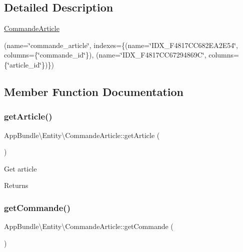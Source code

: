 \subsection{Detailed Description}
\hyperlink{class_app_bundle_1_1_entity_1_1_commande_article}{Commande\+Article}

(name=\char`\"{}commande\+\_\+article\char`\"{}, indexes=\{(name=\char`\"{}\+I\+D\+X\+\_\+\+F4817\+C\+C682\+E\+A2\+E54\char`\"{}, columns=\{\char`\"{}commande\+\_\+id\char`\"{}\}), (name=\char`\"{}\+I\+D\+X\+\_\+\+F4817\+C\+C67294869\+C\char`\"{}, columns=\{\char`\"{}article\+\_\+id\char`\"{}\})\})  

\subsection{Member Function Documentation}
\mbox{\label{class_app_bundle_1_1_entity_1_1_commande_article_a2dc6f8df663dee7a5beeb9758eddccfc}} 
\subsubsection{\texorpdfstring{get\+Article()}{getArticle()}}
{\footnotesize\ttfamily App\+Bundle\textbackslash{}\+Entity\textbackslash{}\+Commande\+Article\+::get\+Article (\begin{DoxyParamCaption}{ }\end{DoxyParamCaption})}

Get article

\begin{DoxyReturn}{Returns}

\end{DoxyReturn}
\mbox{\label{class_app_bundle_1_1_entity_1_1_commande_article_a40f0f1c94d901aac6763d2e506e22569}} 
\subsubsection{\texorpdfstring{get\+Commande()}{getCommande()}}
{\footnotesize\ttfamily App\+Bundle\textbackslash{}\+Entity\textbackslash{}\+Commande\+Article\+::get\+Commande (\begin{DoxyParamCaption}{ }\end{DoxyParamCaption})}

